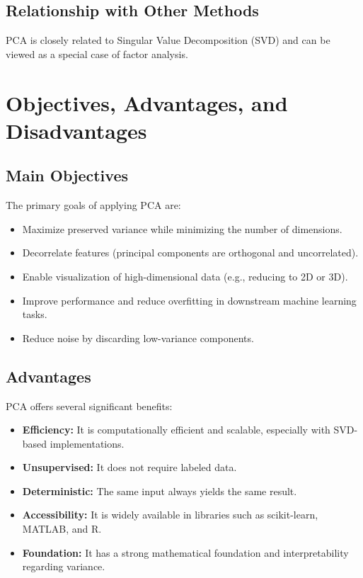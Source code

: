 \documentclass[12pt, a4paper]{report}
\begin{document}
\subsection{Relationship with Other Methods}
PCA is closely related to Singular Value Decomposition (SVD) and can be viewed as a special case of factor analysis.

\section{Objectives, Advantages, and Disadvantages}

\subsection{Main Objectives}
The primary goals of applying PCA are:
\begin{itemize}
    \item Maximize preserved variance while minimizing the number of dimensions.
    \item Decorrelate features (principal components are orthogonal and uncorrelated).
    \item Enable visualization of high-dimensional data (e.g., reducing to 2D or 3D).
    \item Improve performance and reduce overfitting in downstream machine learning tasks.
    \item Reduce noise by discarding low-variance components.
\end{itemize}

\subsection{Advantages}
PCA offers several significant benefits:
\begin{itemize}
    \item \textbf{Efficiency:} It is computationally efficient and scalable, especially with SVD-based implementations.
    \item \textbf{Unsupervised:} It does not require labeled data.
    \item \textbf{Deterministic:} The same input always yields the same result.
    \item \textbf{Accessibility:} It is widely available in libraries such as scikit-learn, MATLAB, and R.
    \item \textbf{Foundation:} It has a strong mathematical foundation and interpretability regarding variance.
\end{itemize}
\end{document}
